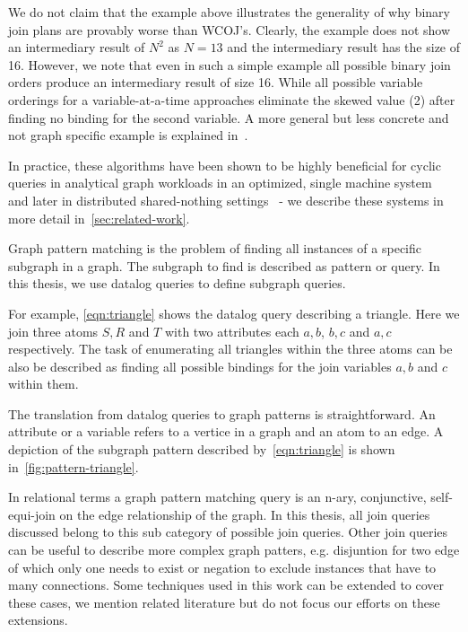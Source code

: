 We do not claim that the example above illustrates the generality of why binary join plans are provably worse than
\textsc{WCOJ}'s.
Clearly, the example does not show an intermediary result of $N^2$ as $N = 13$ and the intermediary result has the size of 16.
However, we note that even in such a simple example all possible binary join orders produce an intermediary result of size 16.
While all possible variable orderings for a variable-at-a-time approaches eliminate the skewed value (2) after finding no binding
for the second variable.
A more general but less concrete and not graph specific example is explained in~\cite{skew-strikes-back}.

In practice, these algorithms have been shown to be highly beneficial for cyclic queries in analytical graph workloads in an optimized,
single machine system~\cite{leapfrog,olddog}
and later in distributed shared-nothing settings~\cite{myria-detailed,ammar2018distributed}
- we describe these systems in more detail in~\cref{sec:related-work}.

Graph pattern matching is the problem of finding all instances of a specific subgraph in a graph.
The subgraph to find is described as pattern or query.
In this thesis, we use datalog queries to define subgraph queries.

For example, \cref{eqn:triangle} shows the datalog query describing a triangle.
Here we join three atoms $S, R$ and $T$ with two attributes each $a, b$, $b, c$ and $a, c$ respectively.
The task of enumerating all triangles within the three atoms can be also be described as finding all possible
bindings for the join variables $a, b$ and $c$ within them.

The translation from datalog queries to graph patterns is straightforward.
An attribute or a variable refers to a vertice in a graph and an atom to an edge.
A depiction of the subgraph pattern described by~\cref{eqn:triangle} is shown in~\cref{fig:pattern-triangle}.

In relational terms a graph pattern matching query is an n-ary, conjunctive, self-equi-join on the edge relationship of the graph.
In this thesis, all join queries discussed belong to this sub category of possible join queries.
Other join queries can be useful to describe more complex graph patters, e.g. disjuntion for two edge of which only one needs to
exist or negation to exclude instances that have to many connections.
Some techniques used in this work can be extended to cover these cases, we mention related literature but do not focus
our efforts on these extensions.

